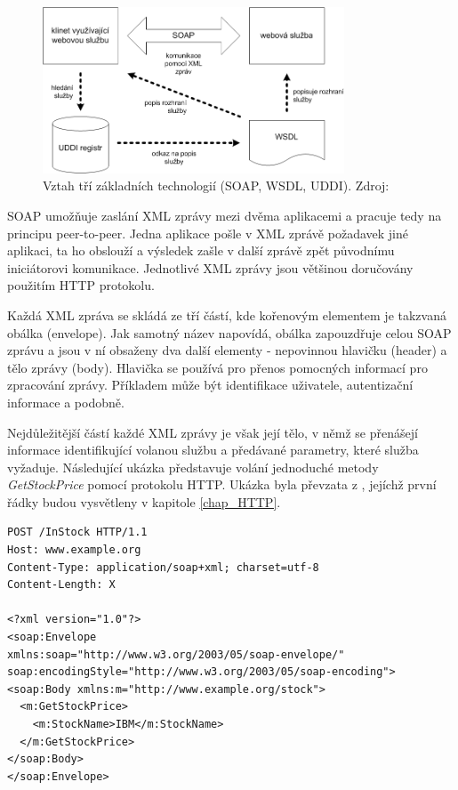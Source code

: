 \begin{figure}[hbt]
	\centering
	\includegraphics[width=0.8\textwidth]{obrazky-figures/komunikace-webservices.png}
	\caption{Vztah tří základních technologií (SOAP, WSDL, UDDI). Zdroj: \cite{Kosek_InteligentniPodporaNavigace}}
	\label{fig_UkazkaKomunikaceWebServices}
\end{figure}

SOAP umožňuje zaslání XML zprávy mezi dvěma aplikacemi a pracuje tedy na principu peer-to-peer. Jedna aplikace pošle v XML zprávě požadavek jiné aplikaci, ta ho obslouží a výsledek zašle v další zprávě zpět původnímu iniciátorovi komunikace. Jednotlivé XML zprávy jsou většinou doručovány použitím HTTP protokolu.\cite{Kosek_InteligentniPodporaNavigace}

Každá XML zpráva se skládá ze tří částí, kde kořenovým elementem je takzvaná obálka (envelope). Jak samotný název napovídá, obálka zapouzdřuje celou SOAP zprávu a jsou v ní obsaženy dva další elementy - nepovinnou hlavičku (header) a tělo zprávy (body). Hlavička se používá pro přenos pomocných informací pro zpracování zprávy. Příkladem může být identifikace uživatele, autentizační informace a podobně.\cite{Kosek_InteligentniPodporaNavigace} 

Nejdůležitější částí každé XML zprávy je však její tělo, v němž se přenášejí informace identifikující volanou službu a předávané parametry, které služba vyžaduje. Následující ukázka představuje volání jednoduché metody \textit{GetStockPrice} pomocí protokolu HTTP. Ukázka byla převzata z \cite{w3schools}, jejíchž první řádky budou vysvětleny v kapitole \ref{chap_HTTP}.


\begin{lstlisting}[frame=single]
POST /InStock HTTP/1.1
Host: www.example.org
Content-Type: application/soap+xml; charset=utf-8
Content-Length: X

<?xml version="1.0"?>
<soap:Envelope
xmlns:soap="http://www.w3.org/2003/05/soap-envelope/"
soap:encodingStyle="http://www.w3.org/2003/05/soap-encoding">
<soap:Body xmlns:m="http://www.example.org/stock">
  <m:GetStockPrice>
    <m:StockName>IBM</m:StockName>
  </m:GetStockPrice>
</soap:Body>
</soap:Envelope>
\end{lstlisting}

